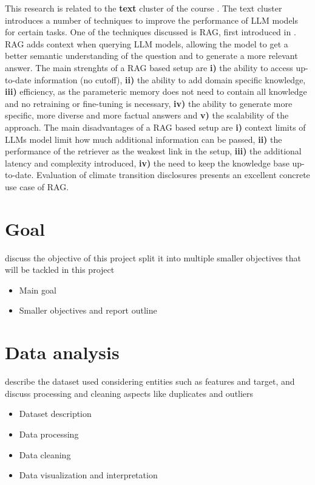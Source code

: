 \documentclass[]{article}
\begin{document}
This research is related to the \textbf{text} cluster of the course \cite{ou}.
The text cluster introduces a number of techniques to improve the performance of LLM models for certain tasks.
One of the techniques discussed is RAG, first introduced in \cite{rag}.
RAG adds context when querying LLM models, allowing the model to get a better semantic understanding of the question and to generate a more relevant answer.
The main strenghts of a RAG based setup are \textbf{i)} the ability to access up-to-date information (no cutoff), \textbf{ii)} the ability to add domain specific knowledge, \textbf{iii)} efficiency, as the parameteric memory does not need to contain all knowledge and no retraining or fine-tuning is necessary, \textbf{iv)} the ability to generate more specific, more diverse and more factual answers and \textbf{v)} the scalability of the approach.
The main disadvantages of a RAG based setup are \textbf{i)} context limits of LLMs model limit how much additional information can be passed, \textbf{ii)} the performance of the retriever as the weakest link in the setup, \textbf{iii)} the additional latency and complexity introduced, \textbf{iv)} the need to keep the knowledge base up-to-date.
Evaluation of climate transition disclosures presents an excellent concrete use case of RAG.

\section{Goal}
discuss the objective of this project split it into multiple smaller objectives that will be tackled in this project
\begin{itemize}
    \item Main goal
    \item Smaller objectives and report outline
\end{itemize}

\section{Data analysis}
describe the dataset used considering entities such as features and target, and discuss processing and cleaning aspects like duplicates and outliers
\begin{itemize}
    \item Dataset description
    \item Data processing
    \item Data cleaning
    \item Data visualization and interpretation
\end{itemize}
\end{document}

